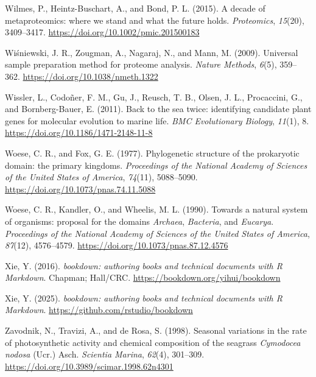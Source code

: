 \documentclass[
  12 pt,
]{book}
\newlength{\cslhangindent}
\newlength{\cslentryspacingunit} %
\newenvironment{CSLReferences}[2] %
 {%
  \setlength{\parindent}{0pt}
  \ifodd #1
  \let\oldpar\par
  \def\par{\hangindent=\cslhangindent\oldpar}
  \fi
  \setlength{\parskip}{#2\cslentryspacingunit}
 }%
 {}
\begin{document}
\begin{CSLReferences}{1}{0}
\leavevmode{}%
Wilmes, P., Heintz-Buschart, A., and Bond, P. L. (2015). A decade of metaproteomics: where we stand and what the future holds. \emph{Proteomics}, \emph{15}(20), 3409--3417. \url{https://doi.org/10.1002/pmic.201500183}

\leavevmode{}%
Wiśniewski, J. R., Zougman, A., Nagaraj, N., and Mann, M. (2009). Universal sample preparation method for proteome analysis. \emph{Nature Methods}, \emph{6}(5), 359--362. \url{https://doi.org/10.1038/nmeth.1322}

\leavevmode{}%
Wissler, L., Codoñer, F. M., Gu, J., Reusch, T. B., Olsen, J. L., Procaccini, G., and Bornberg-Bauer, E. (2011). Back to the sea twice: identifying candidate plant genes for molecular evolution to marine life. \emph{BMC Evolutionary Biology}, \emph{11}(1), 8. \url{https://doi.org/10.1186/1471-2148-11-8}

\leavevmode{}%
Woese, C. R., and Fox, G. E. (1977). Phylogenetic structure of the prokaryotic domain: the primary kingdoms. \emph{Proceedings of the National Academy of Sciences of the United States of America}, \emph{74}(11), 5088--5090. \url{https://doi.org/10.1073/pnas.74.11.5088}

\leavevmode{}%
Woese, C. R., Kandler, O., and Wheelis, M. L. (1990). Towards a natural system of organisms: proposal for the domains {{\emph{Archaea}}}, {{\emph{Bacteria}}}, and {{\emph{Eucarya}}}. \emph{Proceedings of the National Academy of Sciences of the United States of America}, \emph{87}(12), 4576--4579. \url{https://doi.org/10.1073/pnas.87.12.4576}

\leavevmode{}%
Xie, Y. (2016). \emph{{bookdown: authoring books and technical documents with R Markdown}}. Chapman; Hall/CRC. \url{https://bookdown.org/yihui/bookdown}

\leavevmode{}%
Xie, Y. (2025). \emph{{bookdown: authoring books and technical documents with R Markdown}}. \url{https://github.com/rstudio/bookdown}

\leavevmode{}%
Zavodnik, N., Travizi, A., and de Rosa, S. (1998). Seasonal variations in the rate of photosynthetic activity and chemical composition of the seagrass {{\emph{Cymodocea nodosa}}} ({Ucr}.) {Asch}. \emph{Scientia Marina}, \emph{62}(4), 301--309. \url{https://doi.org/10.3989/scimar.1998.62n4301}


\end{CSLReferences}
\end{document}

